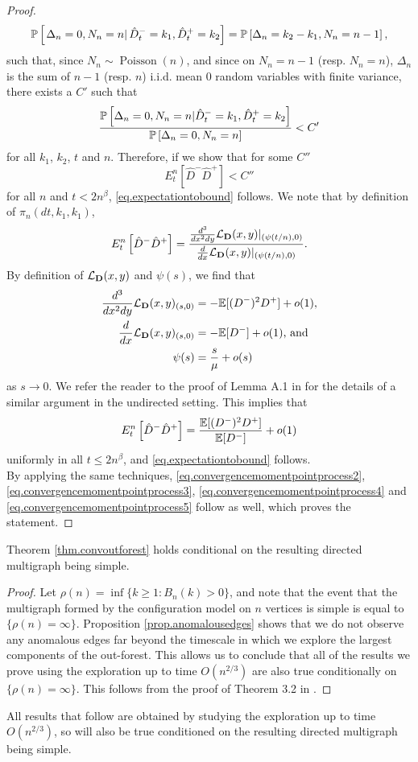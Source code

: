\begin{proof}
$$\P\left[\left. \Delta_n=0, N_n=n \right| \hat{D}^-_t=k_1,\hat{D}^+_t=k_2\right]=\P\left[ \Delta_n=k_2-k_1, N_n=n-1 \right],$$
such that, since $N_n\sim \operatorname{Poisson}(n)$, and since on $N_n=n-1$ (resp. $N_n=n$),  $\Delta_n$ is the sum of $n-1$ (resp. $n$) i.i.d. mean $0$ random variables with finite variance, there exists a $C'$ such that
$$\frac{\P\left[ \Delta_n=0, N_n=n | \hat{D}^-_t=k_1,\hat{D}^+_t=k_2\right]}{\P\left[ \Delta_n=0, N_n=n\right]}<C'$$
for all $k_1$, $k_2$, $t$ and $n$. Therefore, if we show that for some $C''$ $${E}^n_t\left[\hat{D}^-\hat{D}^+\right]<C''$$ for all $n$ and $t<2n^\beta$,  \eqref{eq.expectationtobound} follows. We note that by definition of $\pi_n(dt,k_1,k_1)$, 
$${E}^n_t\left[\hat{D}^-\hat{D}^+\right]=\frac{\frac{d^3}{dx^2 dy}\cL_{\mathbf{D}}(x,y)|_{(\psi(t/n),0)}}{\frac{d}{dx}\cL_{\mathbf{D}}(x,y)|_{(\psi(t/n),0)}}.$$
By definition of $\cL_{\mathbf{D}}(x,y)$ and $\psi(s)$, we find that 
\begin{align*}\frac{d^3}{dx^2 dy}\cL_{\mathbf{D}}(x,y)_{(s,0)}&=-\E[(D^-)^2D^+]+o(1),\\
\frac{d}{dx}\cL_{\mathbf{D}}(x,y)_{(s,0)}&=-\E[D^-]+o(1)\text{, and}\\
\psi(s)&=\frac{s}{\mu}+o(s)\end{align*}
as $s\to 0$. We refer the reader to the proof of Lemma A.1 in \cite{Joseph2014} for the details of a similar argument in the undirected setting. This implies that 
$${E}^n_t\left[\hat{D}^-\hat{D}^+\right]=\frac{\E[(D^-)^2D^+]}{\E[D^-]}+o(1)$$
uniformly in all $t\leq 2n^\beta$, and \eqref{eq.expectationtobound} follows. \\
By applying the same techniques, \eqref{eq.convergencemomentpointprocess2}, \eqref{eq.convergencemomentpointprocess3}, \eqref{eq.convergencemomentpointprocess4} and  \eqref{eq.convergencemomentpointprocess5} follow as well, which proves the statement.


\end{proof}
\begin{corollary}
 Theorem \ref{thm.convoutforest} holds conditional on the resulting directed multigraph being simple. 
\end{corollary}
\begin{proof}
Let $\rho(n)=\inf\{k\geq 1:B_n(k)>0\}$, and note that the event that the multigraph formed by the configuration model on $n$ vertices is simple is equal to $\{\rho(n)=\infty\}$. Proposition \ref{prop.anomalousedges} shows that we do not observe any anomalous edges far beyond the timescale in which we explore the largest components of the out-forest. This allows us to conclude that all of the results we prove using the exploration up to time $O(n^{2/3})$ are also true conditionally on $\{\rho(n)=\infty\}$. This follows from the proof of Theorem 3.2 in \cite{Joseph2014}.
\end{proof}
All results that follow are obtained by studying the exploration up to time $O(n^{2/3})$, so will also be true conditioned on the resulting directed multigraph being simple.

